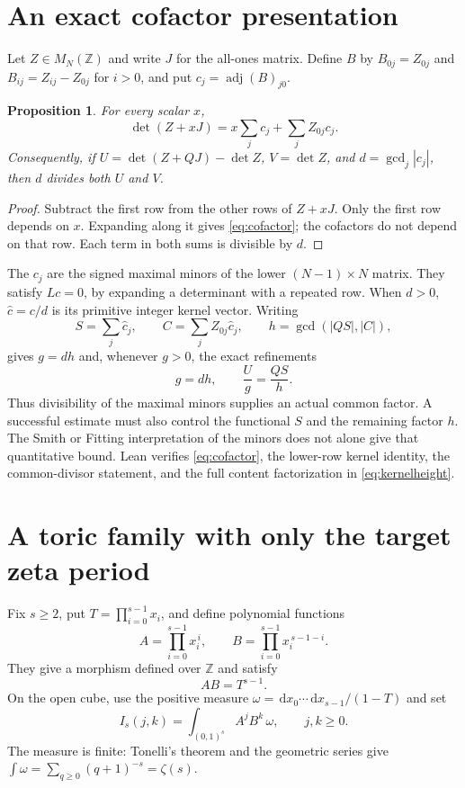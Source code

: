 \documentclass[11pt]{article}
\newtheorem{proposition}[theorem]{Proposition}
\newcommand{\Z}{\mathbb Z}
\newcommand{\dd}{\,\mathrm{d}}
\begin{document}
\section{An exact cofactor presentation}
Let $Z\in M_N(\Z)$ and write $J$ for the all-ones matrix. Define $B$ by
$B_{0j}=Z_{0j}$ and $B_{ij}=Z_{ij}-Z_{0j}$ for $i>0$, and put
$c_j=\operatorname{adj}(B)_{j0}$.
\begin{proposition}
For every scalar $x$,
\begin{equation}
 \det(Z+xJ)=x\sum_jc_j+\sum_j Z_{0j}c_j.
 \label{eq:cofactor}
\end{equation}
Consequently, if
$U=\det(Z+QJ)-\det Z$, $V=\det Z$, and
$d=\gcd_j|c_j|$, then $d$ divides both $U$ and $V$.
\end{proposition}
\begin{proof}
Subtract the first row from the other rows of $Z+xJ$. Only the first
row depends on $x$. Expanding along it gives \eqref{eq:cofactor};
the cofactors do not depend on that row. Each term in both sums is
divisible by $d$.
\end{proof}
The $c_j$ are the signed maximal minors of the lower $(N-1)\times N$
matrix. They satisfy $Lc=0$, by expanding a determinant with a repeated
row. When $d>0$, $\widehat c=c/d$ is its primitive integer kernel vector.
Writing
\[
 S=\sum_j\widehat c_j,\qquad C=\sum_jZ_{0j}\widehat c_j,\qquad
 h=\gcd(|QS|,|C|),
\]
gives $g=dh$ and, whenever $g>0$, the exact refinements
\begin{equation}
 g=dh,\qquad \frac Ug=\frac{QS}{h}.
 \label{eq:kernelheight}
\end{equation}
Thus divisibility of the maximal minors supplies an actual common
factor. A successful estimate must also control the functional $S$
and the remaining factor $h$. The Smith or Fitting interpretation of
the minors does not alone give that quantitative bound.
Lean verifies \eqref{eq:cofactor}, the lower-row kernel identity,
the common-divisor statement, and the full content factorization in
\eqref{eq:kernelheight}.

\section{A toric family with only the target zeta period}
Fix $s\ge2$, put $T=\prod_{i=0}^{s-1}x_i$, and define polynomial functions
\[
 A=\prod_{i=0}^{s-1}x_i^{\,i},\qquad
 B=\prod_{i=0}^{s-1}x_i^{\,s-1-i}.
\]
They give a morphism defined over $\Z$ and satisfy
\begin{equation}
 AB=T^{s-1}.
 \label{eq:toric}
\end{equation}
On the open cube, use the positive measure
$\omega=\dd x_0\cdots\dd x_{s-1}/(1-T)$ and set
\[
 I_s(j,k)=\int_{(0,1)^s} A^jB^k\,\omega,\qquad j,k\ge0 .
\]
The measure is finite: Tonelli's theorem and the geometric series give
$\int\omega=\sum_{q\ge0}(q+1)^{-s}=\zeta(s)$.
\end{document}
